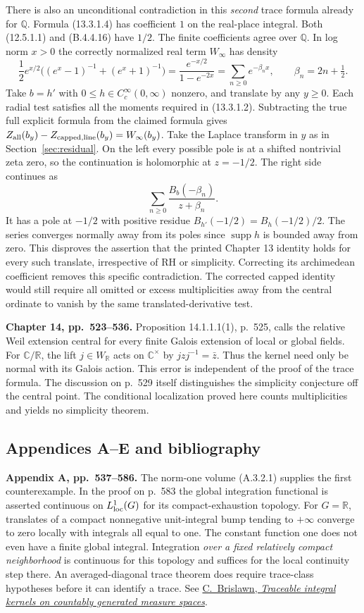 \documentclass[11pt,letterpaper]{article}
\newcommand{\R}{\mathbb R}
\newcommand{\C}{\mathbb C}
\newcommand{\Q}{\mathbb Q}
\newcommand{\supp}{\operatorname{supp}}
\newcommand{\head}[1]{\par\smallskip\textbf{#1}\enspace}
\begin{document}
There is also an unconditional contradiction in this \emph{second} trace formula already for $\Q$. Formula (13.3.1.4) has coefficient $1$ on the real-place integral. Both (12.5.1.1) and (B.4.4.16) have $1/2$. The finite coefficients agree over $\Q$. In log norm $x>0$ the correctly normalized real term $W_\infty$ has density
\[
 \frac12 e^{x/2}\big((e^x-1)^{-1}+(e^x+1)^{-1}\big)
 =\frac{e^{-x/2}}{1-e^{-2x}}=\sum_{n\ge0}e^{-\beta_n x},\qquad \beta_n=2n+\tfrac12.
\]
Take $b=h'$ with $0\le h\in C_c^\infty(0,\infty)$ nonzero, and translate by any $y\ge0$. Each radial test satisfies all the moments required in (13.3.1.2). Subtracting the true full explicit formula from the claimed formula gives $Z_{\rm all}(b_y)-Z_{\rm capped,line}(b_y)=W_\infty(b_y)$. Take the Laplace transform in $y$ as in Section~\ref{sec:residual}. On the left every possible pole is at a shifted nontrivial zeta zero, so the continuation is holomorphic at $z=-1/2$. The right side continues as
\[
 \sum_{n\ge0}\frac{B_b(-\beta_n)}{z+\beta_n}.
\]
It has a pole at $-1/2$ with positive residue $B_{h'}(-1/2)=B_h(-1/2)/2$. The series converges normally away from its poles since $\supp h$ is bounded away from zero. This disproves the assertion that the printed Chapter 13 identity holds for every such translate, irrespective of RH or simplicity. Correcting its archimedean coefficient removes this specific contradiction. The corrected capped identity would still require all omitted or excess multiplicities away from the central ordinate to vanish by the same translated-derivative test.

\head{Chapter 14, pp.~523--536.}
Proposition 14.1.1.1(1), p.~525, calls the relative Weil extension central for every finite Galois extension of local or global fields. For $\C/\R$, the lift $j\in W_\R$ acts on $\C^\times$ by $jzj^{-1}=\bar z$. Thus the kernel need only be normal with its Galois action. This error is independent of the proof of the trace formula. The discussion on p.~529 itself distinguishes the simplicity conjecture off the central point. The conditional localization proved here counts multiplicities and yields no simplicity theorem.

\subsection*{Appendices A--E and bibliography}

\head{Appendix A, pp.~537--586.}
The norm-one volume (A.3.2.1) supplies the first counterexample. In the proof on p.~583 the global integration functional is asserted continuous on $L^1_{\rm loc}(G)$ for its compact-exhaustion topology. For $G=\R$, translates of a compact nonnegative unit-integral bump tending to $+\infty$ converge to zero locally with integrals all equal to one. The constant function one does not even have a finite global integral. Integration \emph{over a fixed relatively compact neighborhood} is continuous for this topology and suffices for the local continuity step there. An averaged-diagonal trace theorem does require trace-class hypotheses before it can identify a trace. See \href{https://msp.org/pjm/1991/150-2/pjm-v150-n2-p03-p.pdf}{C.~Brislawn, \emph{Traceable integral kernels on countably generated measure spaces}}.
\end{document}

